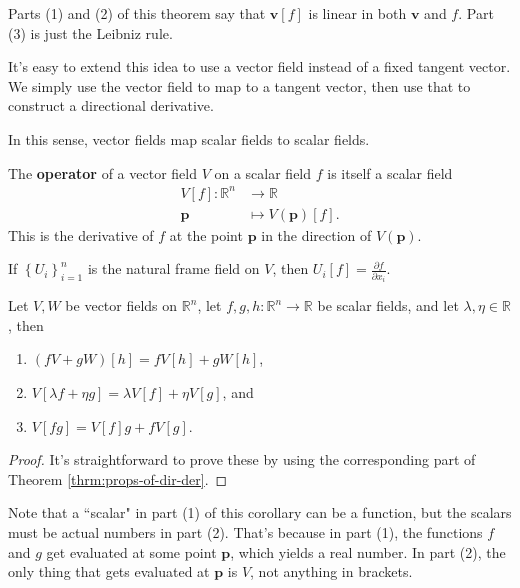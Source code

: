 \documentclass[10pt]{report}
\begin{document}
Parts (1) and (2) of this theorem say that $\mathbf{v}[f]$ is linear in both $\mathbf{v}$ and $f$. Part (3) is just the Leibniz rule.

It's easy to extend this idea to use a vector field instead of a fixed tangent vector. We simply use the vector field to map to a tangent vector, then use that to construct a directional derivative.

\begin{note}
In this sense, vector fields map scalar fields to scalar fields.
\end{note}

\begin{defn}
	The \textbf{operator} of a vector field $V$ on a scalar field $f$ is itself a scalar field
	\begin{align*}
		V[f]: \mathbb{R}^n &\to \mathbb{R} \\
		\mathbf{p} &\mapsto V(\mathbf{p})[f].
	\end{align*}
	This is the derivative of $f$ at the point $\mathbf{p}$ in the direction of $V(\mathbf{p})$.
\end{defn}

\begin{ex}
If $\left\{ U_i \right\}_{i=1}^n$ is the natural frame field on $V$, then $U_i[f] = \frac{\partial f}{\partial x_i} .$
\end{ex}

\begin{cor}
	Let $V,W$ be vector fields on $\mathbb{R}^n$, let $f,g,h:\mathbb{R}^n \to \mathbb{R}$ be scalar fields, and let $\lambda,\eta \in \mathbb{R}$, then
	\begin{enumerate}
		\item $(fV+gW)[h] = fV[h] + gW[h]$,
		\item $V[\lambda f+\eta g] = \lambda V[f] + \eta V[g]$, and
		\item $V[fg] = V[f] g + f V[g]$.
	\end{enumerate}
\end{cor}
\begin{proof}
	It's straightforward to prove these by using the corresponding part of Theorem \ref{thrm:props-of-dir-der}.
\end{proof}

Note that a ``scalar" in part (1) of this corollary can be a function, but the scalars must be actual numbers in part (2). That's because in part (1), the functions $f$ and $g$ get evaluated at some point $\mathbf{p}$, which yields a real number. In part (2), the only thing that gets evaluated at $\mathbf{p}$ is $V$, not anything in brackets.
\end{document}
